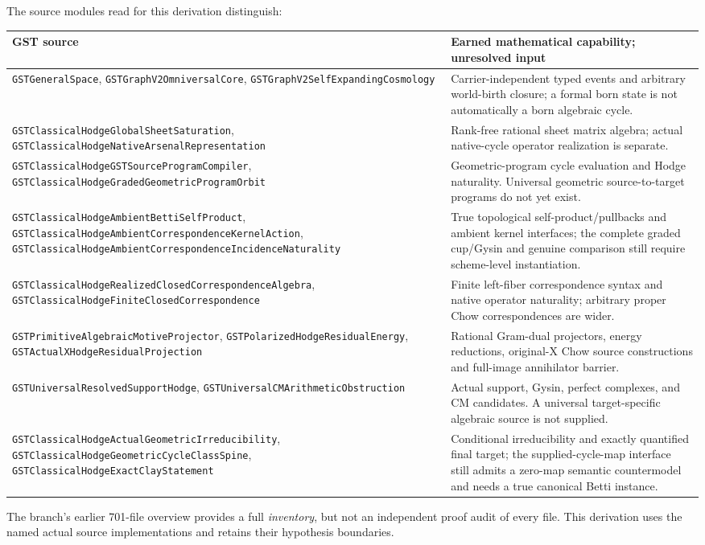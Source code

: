 \documentclass[11pt,a4paper]{article}
\begin{document}
The source modules read for this derivation distinguish:
\begin{longtable}{p{}p{}}
\toprule
GST source & Earned mathematical capability; unresolved input\\
\midrule\endhead
\texttt{GSTGeneralSpace}, \texttt{GSTGraphV2OmniversalCore},
\texttt{GSTGraphV2SelfExpandingCosmology}
& Carrier-independent typed events and arbitrary world-birth closure;
a formal born state is not automatically a born algebraic cycle.\\
\texttt{GSTClassicalHodgeGlobalSheetSaturation},
\texttt{GSTClassicalHodgeNativeArsenalRepresentation}
& Rank-free rational sheet matrix algebra; actual native-cycle
operator realization is separate.\\
\texttt{GSTClassicalHodgeGSTSourceProgramCompiler},
\texttt{GSTClassicalHodgeGradedGeometricProgramOrbit}
& Geometric-program cycle evaluation and Hodge naturality.
Universal geometric source-to-target programs do not yet exist.\\
\texttt{GSTClassicalHodgeAmbientBettiSelfProduct},
\texttt{GSTClassicalHodgeAmbientCorrespondenceKernelAction},
\texttt{GSTClassicalHodgeAmbientCorrespondenceIncidenceNaturality}
& True topological self-product/pullbacks and ambient kernel
interfaces; the complete graded cup/Gysin and genuine comparison
still require scheme-level instantiation.\\
\texttt{GSTClassicalHodgeRealizedClosedCorrespondenceAlgebra},
\texttt{GSTClassicalHodgeFiniteClosedCorrespondence}
& Finite left-fiber correspondence syntax and native operator
naturality; arbitrary proper Chow correspondences are wider.\\
\texttt{GSTPrimitiveAlgebraicMotiveProjector},
\texttt{GSTPolarizedHodgeResidualEnergy},
\texttt{GSTActualXHodgeResidualProjection}
& Rational Gram-dual projectors, energy reductions, original-X Chow
source constructions and full-image annihilator barrier.\\
\texttt{GSTUniversalResolvedSupportHodge},
\texttt{GSTUniversalCMArithmeticObstruction}
& Actual support, Gysin, perfect complexes, and CM candidates.
A universal target-specific algebraic source is not supplied.\\
\texttt{GSTClassicalHodgeActualGeometricIrreducibility},
\texttt{GSTClassicalHodgeGeometricCycleClassSpine},
\texttt{GSTClassicalHodgeExactClayStatement}
& Conditional irreducibility and exactly quantified final target;
the supplied-cycle-map interface still admits a zero-map
semantic countermodel and needs a true canonical Betti instance.\\
\bottomrule
\end{longtable}
The branch's earlier 701-file overview provides a full
\emph{inventory}, but not an independent proof audit of every file.
This derivation uses the named actual source implementations
and retains their hypothesis boundaries.
\end{document}
